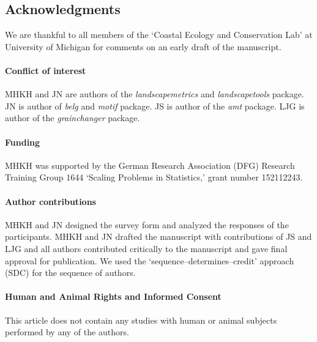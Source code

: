 \documentclass[smallextended]{svjour3}       %
\begin{document}
\hypertarget{acknowledgments}{%
\subsection{Acknowledgments}\label{acknowledgments}}

We are thankful to all members of the `Coastal Ecology and Conservation Lab' at University of Michigan for comments on an early draft of the manuscript.

\hypertarget{conflict-of-interest}{%
\paragraph{Conflict of interest}\label{conflict-of-interest}}

MHKH and JN are authors of the \emph{landscapemetrics} and \emph{landscapetools} package.
JN is author of \emph{belg} and \emph{motif} package. JS is author of the \emph{amt} package. LJG is author of the \emph{grainchanger} package.

\hypertarget{funding}{%
\paragraph{Funding}\label{funding}}

MHKH was supported by the German Research Association (DFG) Research Training Group 1644 `Scaling Problems in Statistics,' grant number 152112243.

\hypertarget{author-contributions}{%
\paragraph{Author contributions}\label{author-contributions}}

MHKH and JN designed the survey form and analyzed the responses of the participants.
MHKH and JN drafted the manuscript with contributions of JS and LJG and all authors contributed critically to the manuscript and gave final approval for publication.
We used the `sequence--determines--credit' approach (SDC) for the sequence of authors.

\hypertarget{human-and-animal-rights-and-informed-consent}{%
\paragraph{Human and Animal Rights and Informed Consent}\label{human-and-animal-rights-and-informed-consent}}

This article does not contain any studies with human or animal subjects performed by any of the authors.




\end{document}
